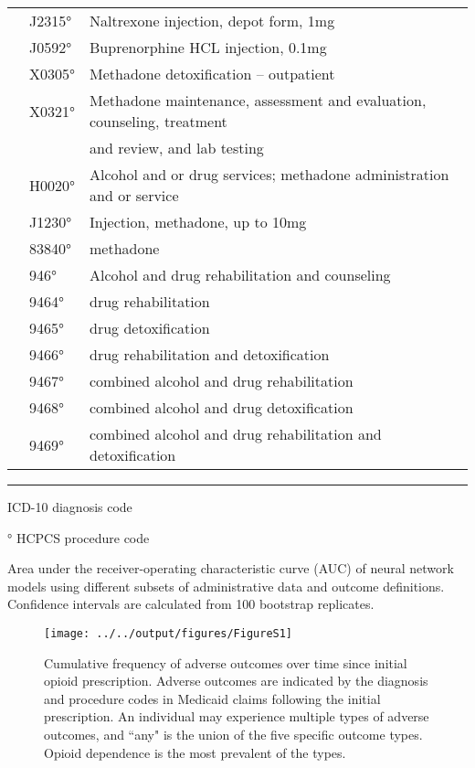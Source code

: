 \documentclass[9pt,twoside]{pnas-new}
\begin{document}
\begin{table}
\begin{tabular}{lll}
 & J2315° & Naltrexone injection, depot form, 1mg \\
 & J0592° & Buprenorphine HCL injection, 0.1mg \\
 & X0305° & Methadone detoxification – outpatient \\
 & X0321° & Methadone maintenance, assessment and evaluation, counseling, treatment \\
 &  & and review, and lab testing \\
 & H0020° & Alcohol and or drug services; methadone administration and or service \\
 & J1230° & Injection, methadone, up to 10mg \\
 & 83840° & methadone \\
 & 946° & Alcohol and drug rehabilitation and counseling \\
 & 9464° & drug rehabilitation \\
 & 9465° & drug detoxification \\
 & 9466° & drug rehabilitation and detoxification \\
 & 9467° & combined alcohol and drug rehabilitation \\
 & 9468° & combined alcohol and drug detoxification \\
 & 9469° & combined alcohol and drug rehabilitation and detoxification \\[1em]
\end{tabular}
\hrule
\begin{tablenotes}
\footnotesize
\item * ICD-10 diagnosis code
\item ° HCPCS procedure code
\end{tablenotes}
\end{table}

\begin{table}
\caption{Area under the receiver-operating characteristic curve (AUC) of neural network models using different subsets of administrative data and outcome definitions. Confidence intervals are calculated from 100 bootstrap replicates.}
\centering

\end{table}

\begin{figure}
\caption{Cumulative frequency of adverse outcomes over time since initial opioid prescription. Adverse outcomes are indicated by the diagnosis and procedure codes in Medicaid claims following the initial prescription. An individual may experience multiple types of adverse outcomes, and ``any" is the union of the five specific outcome types. Opioid dependence is the most prevalent of the types.}
\centering
\texttt{[image: ../../output/figures/FigureS1]}
\end{figure}
\end{document}

